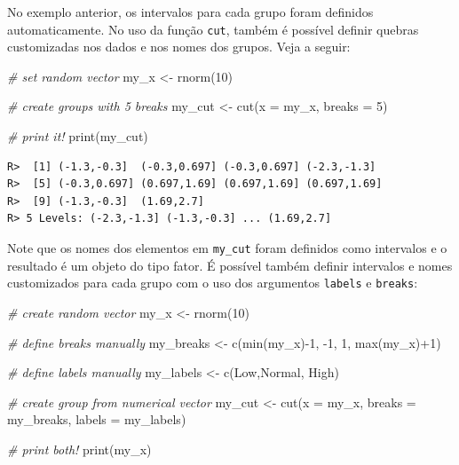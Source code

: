 \documentclass[
  11pt,
]{book}
\newenvironment{Shaded}{\begin{snugshade}}{\end{snugshade}}
\newcommand{\AttributeTok}[1]{\textcolor[rgb]{0.61,0.61,0.61}{#1}}
\newcommand{\CommentTok}[1]{\textcolor[rgb]{0.37,0.37,0.37}{\textit{#1}}}
\newcommand{\DecValTok}[1]{\textcolor[rgb]{0.06,0.06,0.06}{#1}}
\newcommand{\FunctionTok}[1]{\textcolor[rgb]{0,0,0}{#1}}
\newcommand{\NormalTok}[1]{#1}
\newcommand{\OtherTok}[1]{\textcolor[rgb]{0.37,0.37,0.37}{#1}}
\newcommand{\SpecialCharTok}[1]{\textcolor[rgb]{0,0,0}{#1}}
\newcommand{\StringTok}[1]{\textcolor[rgb]{0.5,0.5,0.5}{#1}}
\begin{document}
No exemplo anterior, os intervalos para cada grupo foram definidos automaticamente. No uso da função \texttt{cut}, também é possível definir quebras customizadas nos dados e nos nomes dos grupos. Veja a seguir:

\begin{Shaded}
\begin{Highlighting}[]
\CommentTok{\# set random vector}
\NormalTok{my\_x }\OtherTok{\textless{}{-}} \FunctionTok{rnorm}\NormalTok{(}\DecValTok{10}\NormalTok{)}

\CommentTok{\# create groups with 5 breaks}
\NormalTok{my\_cut }\OtherTok{\textless{}{-}} \FunctionTok{cut}\NormalTok{(}\AttributeTok{x =}\NormalTok{ my\_x, }\AttributeTok{breaks =} \DecValTok{5}\NormalTok{)}

\CommentTok{\# print it!}
\FunctionTok{print}\NormalTok{(my\_cut)}
\end{Highlighting}
\end{Shaded}

\begin{verbatim}
R>  [1] (-1.3,-0.3]  (-0.3,0.697] (-0.3,0.697] (-2.3,-1.3] 
R>  [5] (-0.3,0.697] (0.697,1.69] (0.697,1.69] (0.697,1.69]
R>  [9] (-1.3,-0.3]  (1.69,2.7]  
R> 5 Levels: (-2.3,-1.3] (-1.3,-0.3] ... (1.69,2.7]
\end{verbatim}

Note que os nomes dos elementos em \texttt{my\_cut} foram definidos como intervalos e o resultado é um objeto do tipo fator. É possível também definir intervalos e nomes customizados para cada grupo com o uso dos argumentos \texttt{labels} e \texttt{breaks}:

\begin{Shaded}
\begin{Highlighting}[]
\CommentTok{\# create random vector}
\NormalTok{my\_x }\OtherTok{\textless{}{-}} \FunctionTok{rnorm}\NormalTok{(}\DecValTok{10}\NormalTok{)}

\CommentTok{\# define breaks manually}
\NormalTok{my\_breaks }\OtherTok{\textless{}{-}} \FunctionTok{c}\NormalTok{(}\FunctionTok{min}\NormalTok{(my\_x)}\SpecialCharTok{{-}}\DecValTok{1}\NormalTok{, }\SpecialCharTok{{-}}\DecValTok{1}\NormalTok{, }\DecValTok{1}\NormalTok{, }\FunctionTok{max}\NormalTok{(my\_x)}\SpecialCharTok{+}\DecValTok{1}\NormalTok{)}

\CommentTok{\# define labels manually}
\NormalTok{my\_labels }\OtherTok{\textless{}{-}} \FunctionTok{c}\NormalTok{(}\StringTok{\textquotesingle{}Low\textquotesingle{}}\NormalTok{,}\StringTok{\textquotesingle{}Normal\textquotesingle{}}\NormalTok{, }\StringTok{\textquotesingle{}High\textquotesingle{}}\NormalTok{)}

\CommentTok{\# create group from numerical vector}
\NormalTok{my\_cut }\OtherTok{\textless{}{-}} \FunctionTok{cut}\NormalTok{(}\AttributeTok{x =}\NormalTok{ my\_x, }\AttributeTok{breaks =}\NormalTok{ my\_breaks, }\AttributeTok{labels =}\NormalTok{ my\_labels)}

\CommentTok{\# print both!}
\FunctionTok{print}\NormalTok{(my\_x)}
\end{Highlighting}
\end{Shaded}
\end{document}

